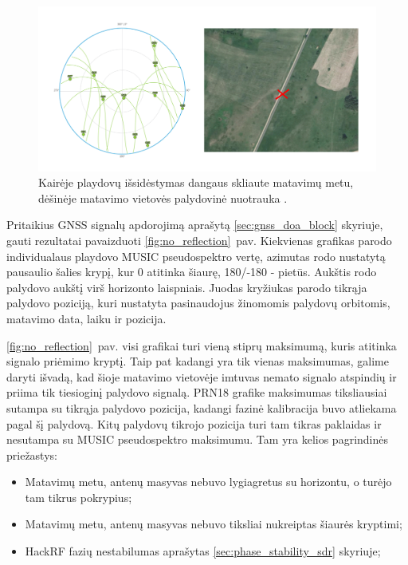 \documentclass[main.tex]{subfiles}
\begin{document}
\begin{figure}[ht]
    \begin{centering}
    \includegraphics[scale=0.35]{drawings/open_sat_positions.drawio}
    \par\end{centering}
    \protect\caption{\label{fig:no_reflection_sat_pos}Kairėje playdovų išsidėstymas dangaus skliaute matavimų metu, dėšinėje matavimo vietovės palydovinė nuotrauka \cite{google_maps}.}
\end{figure}

Pritaikius GNSS signalų apdorojimą aprašytą \ref{sec:gnss_doa_block} skyriuje, gauti
rezultatai pavaizduoti \ref{fig:no_reflection}~pav. Kiekvienas grafikas parodo
individualaus playdovo MUSIC pseudospektro vertę, azimutas rodo nustatytą
pausaulio šalies krypį, kur 0 atitinka šiaurę, 180/-180 - pietūs. Aukštis rodo palydovo aukštį virš horizonto
laispniais.
Juodas kryžiukas parodo tikrąja palydovo poziciją, kuri
nustatyta pasinaudojus žinomomis palydovų orbitomis, matavimo data, laiku ir pozicija.

\ref{fig:no_reflection}~pav. visi grafikai turi vieną stiprų maksimumą, kuris atitinka signalo priėmimo kryptį.
Taip pat kadangi yra tik vienas maksimumas, galime daryti išvadą, kad šioje matavimo vietovėje
imtuvas nemato signalo atspindių ir priima tik tiesioginį palydovo signalą.
PRN18 grafike maksimumas tiksliausiai sutampa su tikrąja palydovo pozicija, kadangi
fazinė kalibracija buvo atliekama pagal šį palydovą.
Kitų palydovų tikrojo pozicija turi tam tikras paklaidas ir nesutampa su MUSIC pseudospektro
maksimumu. Tam yra kelios pagrindinės priežastys:

\begin{itemize}
    \item Matavimų metu, antenų masyvas nebuvo lygiagretus su horizontu, o turėjo tam tikrus pokrypius;
    \item Matavimų metu, antenų masyvas nebuvo tiksliai nukreiptas šiaurės kryptimi;
    \item HackRF fazių nestabilumas aprašytas \ref{sec:phase_stability_sdr} skyriuje;
\end{itemize}
\end{document}
